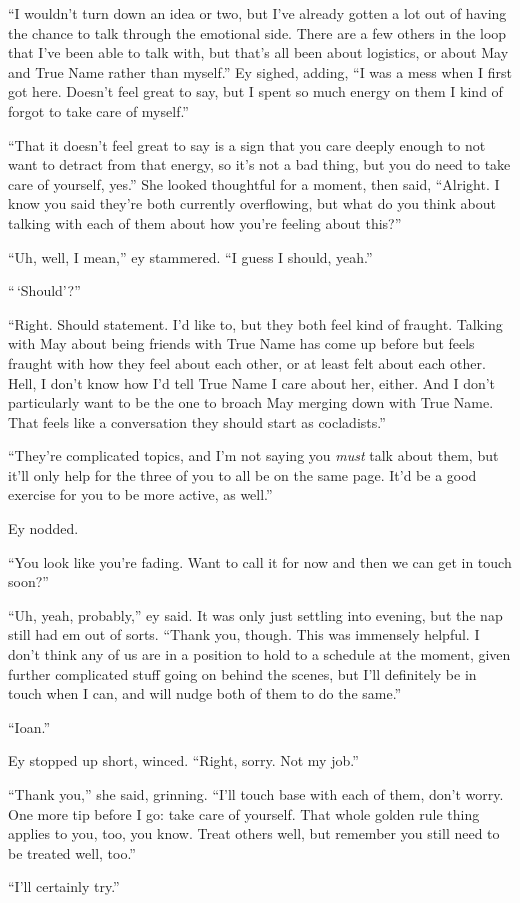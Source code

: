 ``I wouldn't turn down an idea or two, but I've already gotten a lot out of having the chance to talk through the emotional side. There are a few others in the loop that I've been able to talk with, but that's all been about logistics, or about May and True Name rather than myself.'' Ey sighed, adding, ``I was a mess when I first got here. Doesn't feel great to say, but I spent so much energy on them I kind of forgot to take care of myself.''

``That it doesn't feel great to say is a sign that you care deeply enough to not want to detract from that energy, so it's not a bad thing, but you do need to take care of yourself, yes.'' She looked thoughtful for a moment, then said, ``Alright. I know you said they're both currently overflowing, but what do you think about talking with each of them about how you're feeling about this?''

``Uh, well, I mean,'' ey stammered. ``I guess I should, yeah.''

``\,`Should'?''

``Right. Should statement. I'd like to, but they both feel kind of fraught. Talking with May about being friends with True Name has come up before but feels fraught with how they feel about each other, or at least felt about each other. Hell, I don't know how I'd tell True Name I care about her, either. And I don't particularly want to be the one to broach May merging down with True Name. That feels like a conversation they should start as cocladists.''

``They're complicated topics, and I'm not saying you \emph{must} talk about them, but it'll only help for the three of you to all be on the same page. It'd be a good exercise for you to be more active, as well.''

Ey nodded.

``You look like you're fading. Want to call it for now and then we can get in touch soon?''

``Uh, yeah, probably,'' ey said. It was only just settling into evening, but the nap still had em out of sorts. ``Thank you, though. This was immensely helpful. I don't think any of us are in a position to hold to a schedule at the moment, given further complicated stuff going on behind the scenes, but I'll definitely be in touch when I can, and will nudge both of them to do the same.''

``Ioan.''

Ey stopped up short, winced. ``Right, sorry. Not my job.''

``Thank you,'' she said, grinning. ``I'll touch base with each of them, don't worry. One more tip before I go: take care of yourself. That whole golden rule thing applies to you, too, you know. Treat others well, but remember you still need to be treated well, too.''

``I'll certainly try.''
